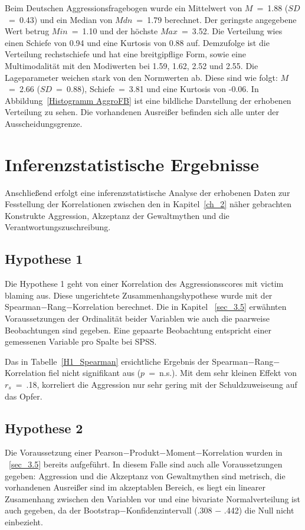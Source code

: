 
Beim Deutschen Aggressionsfragebogen wurde ein Mittelwert von $M$~=~1.88 ($SD$~=~0.43) und ein Median von $Mdn$~=~1.79 berechnet. Der geringste angegebene Wert betrug $Min$~=~1.10 und der höchste $Max$~=~3.52. Die Verteilung wies einen Schiefe von 0.94 und eine Kurtosis von 0.88 auf. Demzufolge ist die Verteilung rechstschiefe und hat eine breitgipflige Form, sowie eine Multimodalität mit den Modiwerten bei 1.59, 1.62, 2.52 und 2.55. Die Lageparameter weichen stark von den Normwerten ab. Diese sind wie folgt: $M$~=~2.66 ($SD$~=~0.88), Schiefe~=~3.81 und eine Kurtosis von -0.06. In Abbildung~\ref{Histogramm AggroFB} ist eine bildliche Darstellung der erhobenen Verteilung zu sehen. Die vorhandenen Ausreißer befinden sich alle unter der Ausscheidungsgrenze.


\section{Inferenzstatistische Ergebnisse}    \label{sec_4.2}
Anschließend erfolgt eine inferenzstatistische Analyse der erhobenen Daten zur Fesstellung der Korrelationen zwischen den in Kapitel~\ref{ch_2} näher gebrachten Konstrukte Aggression, Akzeptanz der Gewaltmythen und die Verantwortungszuschreibung. 


\subsection{Hypothese 1}    \label{subsec_4.2.1}
Die Hypothese 1 geht von einer Korrelation des Aggressionsscores mit victim blaming aus. Diese ungerichtete Zusammenhangshypothese wurde mit der Spearman$-$Rang$-$Korrelation berechnet. Die in Kapitel ~\ref{sec_3.5} erwähnten Voraussetzungen der Ordinalität beider Variablen wie auch die paarweise Beobachtungen sind gegeben. Eine gepaarte Beobachtung entspricht einer gemessenen Variable pro Spalte bei SPSS.


Das in Tabelle~\ref{H1_Spearman} ersichtliche Ergebnis der Spearman$-$Rang$-$Korrelation fiel nicht signifikant aus ($p$~=~n.s.). Mit dem sehr kleinen Effekt \parencite{Cohen_1992} von $r_{s}$~=~.18, korreliert die Aggression nur sehr gering mit der Schuldzuweiseung auf das Opfer.

\subsection{Hypothese 2}    \label{subsec_4.2.2}
Die Voraussetzung einer Pearson$-$Produkt$-$Moment$-$Korrelation wurden in ~\ref{sec_3.5} bereits aufgeführt. In diesem Falle sind auch alle Voraussetzungen gegeben: Aggression und die Akzeptanz von Gewaltmythen sind metrisch, die vorhandenen Ausreißer sind im akzeptablen Bereich, es liegt ein linearer Zusamenhang zwischen den Variablen vor und eine bivariate Normalverteilung ist auch gegeben, da der Bootstrap$-$Konfidenzintervall (.308 $-$ .442) die Null nicht einbezieht.

